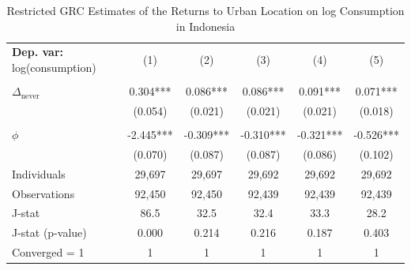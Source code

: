 \begin{table}[htb!] \centering \begin{threeparttable}
 \caption{Restricted GRC Estimates of the Returns to Urban Location on log Consumption in Indonesia} 
 \label{tab:GRC_IDN_consumption_urban_unb} 
\begin{tabular}{l ccccc} \toprule  \textbf{Dep. var:}  log(consumption) 
                    &\multicolumn{1}{c}{(1)}   &\multicolumn{1}{c}{(2)}   &\multicolumn{1}{c}{(3)}   &\multicolumn{1}{c}{(4)}   &\multicolumn{1}{c}{(5)}   \\
                    &               &               &               &               &               \\
$\Delta_{\text{never}}$&       0.304***&       0.086***&       0.086***&       0.091***&       0.071***\\
                    &     (0.054)   &     (0.021)   &     (0.021)   &     (0.021)   &     (0.018)   \\
                    &               &               &               &               &               \\
$\phi$               &      -2.445***&      -0.309***&      -0.310***&      -0.321***&      -0.526***\\
                    &     (0.070)   &     (0.087)   &     (0.087)   &     (0.086)   &     (0.102)   \\
\addlinespace
Individuals         &      29,697   &      29,697   &      29,692   &      29,692   &      29,692   \\
Observations        &      92,450   &      92,450   &      92,439   &      92,439   &      92,439   \\
J-stat              &        86.5   &        32.5   &        32.4   &        33.3   &        28.2   \\
J-stat (p-value)    &       0.000   &       0.214   &       0.216   &       0.187   &       0.403   \\
Converged = 1       &           1   &           1   &           1   &           1   &           1   \\

\end{tabular}
\end{threeparttable}
\end{table}
